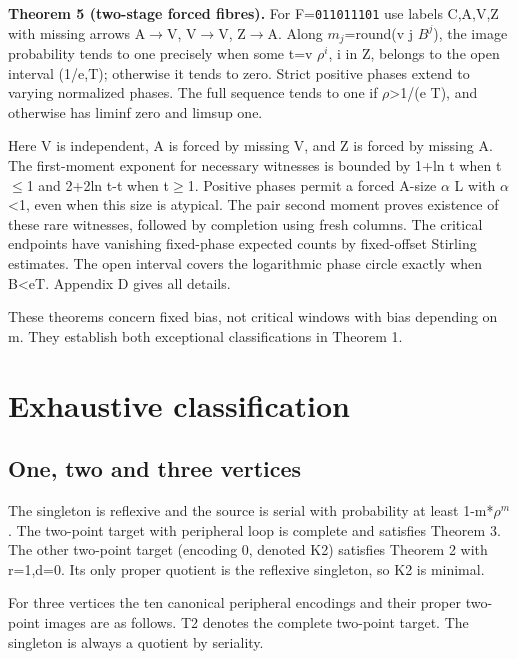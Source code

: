 \documentclass[11pt]{article}
\begin{document}
\textbf{Theorem 5 (two-stage forced fibres).} For F=\texttt{011011101} use labels C,A,V,Z with missing arrows A\ensuremath{\to}V, V\ensuremath{\to}V, Z\ensuremath{\to}A. Along $m_{j}$=round(v j $B^{j}$), the image probability tends to one precisely when some t=v $\rho^{i}$, i in Z, belongs to the open interval (1/e,T); otherwise it tends to zero. Strict positive phases extend to varying normalized phases. The full sequence tends to one if $\rho$>1/(e T), and otherwise has liminf zero and limsup one.

Here V is independent, A is forced by missing V, and Z is forced by missing A. The first-moment exponent for necessary witnesses is bounded by 1+ln t when t\ensuremath{\leq}1 and 2+2ln t-t when t\ensuremath{\geq}1. Positive phases permit a forced A-size $\alpha$ L with $\alpha$<1, even when this size is atypical. The pair second moment proves existence of these rare witnesses, followed by completion using fresh columns. The critical endpoints have vanishing fixed-phase expected counts by fixed-offset Stirling estimates. The open interval covers the logarithmic phase circle exactly when B<eT. Appendix D gives all details.

These theorems concern fixed bias, not critical windows with bias depending on m. They establish both exceptional classifications in Theorem 1.

\section{Exhaustive classification}

\subsection{One, two and three vertices}

The singleton is reflexive and the source is serial with probability at least 1-m*$\rho^{m}$. The two-point target with peripheral loop is complete and satisfies Theorem 3. The other two-point target (encoding 0, denoted K2) satisfies Theorem 2 with r=1,d=0. Its only proper quotient is the reflexive singleton, so K2 is minimal.

For three vertices the ten canonical peripheral encodings and their proper two-point images are as follows. T2 denotes the complete two-point target. The singleton is always a quotient by seriality.
\end{document}
